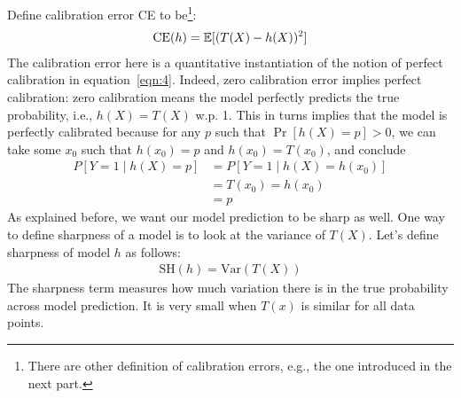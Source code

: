Define calibration error CE to be\footnote{There are other definition of calibration errors, e.g., the one introduced in the next part.}:
\begin{align}
	\text{CE}(h) = \mathbb{E} [(T(X) - h(X))^2]
\end{align}
The calibration error here is a quantitative instantiation of the notion of perfect calibration in equation~\eqref{eqn:4}.  Indeed,  zero calibration error implies perfect calibration: zero calibration means the model perfectly predicts the true probability, i.e., $h(X) = T(X)$ w.p. 1. This in turns implies that the model is perfectly calibrated because for any $p$ such that $\Pr[h(X)=p] > 0$, we can take some $x_0$ such that $h(x_0) = p$ and $h(x_0)=T(x_0)$, and conclude
\begin{align}
P[Y=1\mid h(X)= p] & = P[Y=1\mid h(X)= h(x_0)] \\
& = T(x_0) = h(x_0) \tag{by calibration error = 0} \\
& = p \tag{by the assumption that $h(x_0)= p$}
\end{align}
As explained before, we want our model prediction to be sharp as well. 
One way to define sharpness of a model is to look at the variance of $T(X)$. 
Let's define sharpness of model $h$ as follows:
\begin{align}
\text {SH}(h) = \text {Var} (T(X))
\end{align}
The sharpness term measures how much variation there is in the true probability across model prediction.
It is very small when $T(x)$ is similar for all data points. 

